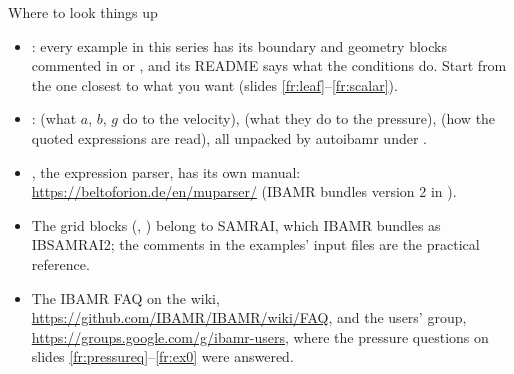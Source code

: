 \documentclass[aspectratio=169,11pt]{beamer}
\begin{document}
\begin{frame}{Where to look things up}
\label{fr:lookup}
\small
\begin{itemize}
  \item {}: every example in this series has its boundary and geometry blocks commented in  or , and its README says what the conditions do. Start from the one closest to what you want (slides \ref{fr:leaf}--\ref{fr:scalar}).
  \item {}:  (what $a$, $b$, $g$ do to the velocity),  (what they do to the pressure),  (how the quoted expressions are read), all unpacked by autoibamr under .
  \item {}, the expression parser, has its own manual: \url{https://beltoforion.de/en/muparser/} (IBAMR bundles version 2 in ).
  \item The grid blocks (, ) belong to SAMRAI, which IBAMR bundles as IBSAMRAI2; the comments in the examples' input files are the practical reference.
  \item The IBAMR FAQ on the wiki, \url{https://github.com/IBAMR/IBAMR/wiki/FAQ}, and the users' group, \url{https://groups.google.com/g/ibamr-users}, where the pressure questions on slides \ref{fr:pressureq}--\ref{fr:ex0} were answered.
\end{itemize}
\end{frame}
\end{document}
